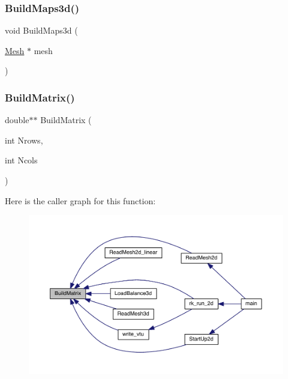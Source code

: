 \subsubsection{\texorpdfstring{Build\+Maps3d()}{BuildMaps3d()}}
{\footnotesize\ttfamily void Build\+Maps3d (\begin{DoxyParamCaption}\item[{\hyperlink{a00557_aeffbe0891ab73a4d8964c9cb7978426e}{Mesh} $\ast$}]{mesh }\end{DoxyParamCaption})}

\mbox{\label{a00554_a4bf6e503687187059ced10b812beaab3}} 
\subsubsection{\texorpdfstring{Build\+Matrix()}{BuildMatrix()}}
{\footnotesize\ttfamily double$\ast$$\ast$ Build\+Matrix (\begin{DoxyParamCaption}\item[{int}]{Nrows,  }\item[{int}]{Ncols }\end{DoxyParamCaption})}

Here is the caller graph for this function\+:\nopagebreak
\begin{figure}[H]
\begin{center}
\leavevmode
\includegraphics[width=350pt]{a00554_a4bf6e503687187059ced10b812beaab3_icgraph}
\end{center}
\end{figure}
\mbox{\label{a00554_a990278305dbeaf8e4441cf4146bfdc62}} 
